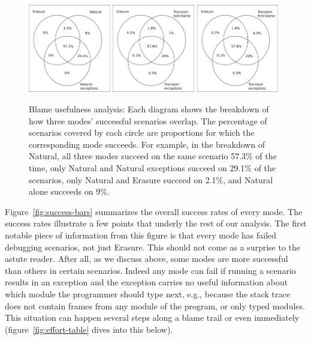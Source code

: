 \begin{figure}
  \centering
  \includegraphics[width=0.32\textwidth]{./plots/TR-TR-stack-first-venn}
  \hfill
  \includegraphics[width=0.32\textwidth]{./plots/transient-newest-transient-stack-first-venn}
  \hfill
  \includegraphics[width=0.32\textwidth]{./plots/transient-oldest-transient-stack-first-venn}

  \caption{Blame usefulness analysis: Each diagram shows the breakdown of how three modes' successful scenarios overlap.
  The percentage of scenarios covered by each circle are proportions for which the corresponding mode succeeds.
  For example, in the breakdown of Natural, all three modes succeed on the same scenario 57.3\% of the time, only Natural and Natural exceptions succeed on 29.1\% of the scenarios, only Natural and Erasure succeed on 2.1\%, and Natural alone succeeds on 9\%.
  }
  \label{fig:success-venns}
\end{figure}


Figure~\ref{fig:success-bars} summarizes the overall success rates of every mode.
The success rates illustrate a few points that underly the rest of our analysis.
The first notable piece of information from
this figure is that every mode has failed debugging scenarios, not just
Erasure. This should
not come as a surprise to the astute
reader. After all, as we
discuss above, some modes are more successful than others in certain
scenarios. Indeed any mode can fail if running a scenario results in an
exception and the exception carries no useful information about which
module the programmer should type next, e.g., because the stack trace 
does not contain frames from any module of the program, or only typed modules. This situation
can happen several steps along a blame trail or even immediately (figure~\ref{fig:effort-table} dives into this below).


